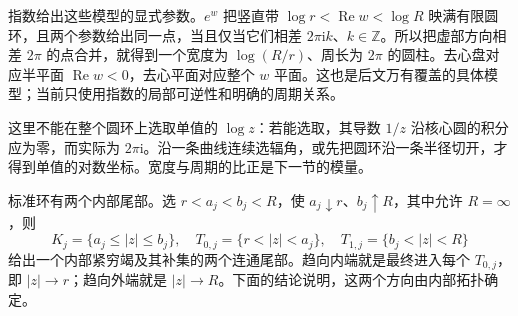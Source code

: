 \ProseParagraphBreak
指数给出这些模型的显式参数。\(e^w\) 把竖直带 \(\log r<\operatorname{Re}w<\log R\) 映满有限圆环，且两个参数给出同一点，当且仅当它们相差 \(2\pi\mathrm i k\)、\(k\in\mathbb Z\)。所以把虚部方向相差 \(2\pi\) 的点合并，就得到一个宽度为 \(\log(R/r)\)、周长为 \(2\pi\) 的圆柱。去心盘对应半平面 \(\operatorname{Re}w<0\)，去心平面对应整个 \(w\) 平面。这也是后文万有覆盖的具体模型；当前只使用指数的局部可逆性和明确的周期关系。

\ProseParagraphBreak
这里不能在整个圆环上选取单值的 \(\log z\)：若能选取，其导数 \(1/z\) 沿核心圆的积分应为零，而实际为 \(2\pi\mathrm i\)。沿一条曲线连续选辐角，或先把圆环沿一条半径切开，才得到单值的对数坐标。宽度与周期的比正是下一节的模量。

\ProseParagraphBreak
标准环有两个内部尾部。选 \(r<a_j<b_j<R\)，使 \(a_j\downarrow r\)、\(b_j\uparrow R\)，其中允许 \(R=\infty\)，则
\[
 K_j=\{a_j\le|z|\le b_j\},\quad
 T_{0,j}=\{r<|z|<a_j\},\quad
 T_{1,j}=\{b_j<|z|<R\}
\]
给出一个内部紧穷竭及其补集的两个连通尾部。趋向内端就是最终进入每个 \(T_{0,j}\)，即 \(|z|\to r\)；趋向外端就是 \(|z|\to R\)。下面的结论说明，这两个方向由内部拓扑确定。

